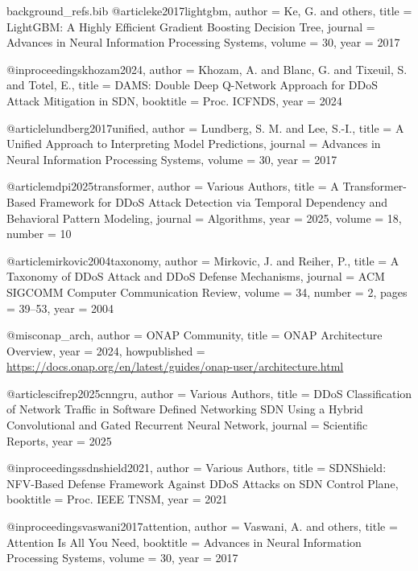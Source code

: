 \begin{filecontents*}{background_refs.bib}
@article{ke2017lightgbm,
  author  = {Ke, G. and others},
  title   = {{LightGBM: A Highly Efficient Gradient Boosting Decision Tree}},
  journal = {Advances in Neural Information Processing Systems},
  volume  = {30},
  year    = {2017}
}

@inproceedings{khozam2024,
  author    = {Khozam, A. and Blanc, G. and Tixeuil, S. and Totel, E.},
  title     = {{DAMS: Double Deep Q-Network Approach for DDoS Attack Mitigation in SDN}},
  booktitle = {Proc. ICFNDS},
  year      = {2024}
}

@article{lundberg2017unified,
  author  = {Lundberg, S. M. and Lee, S.-I.},
  title   = {{A Unified Approach to Interpreting Model Predictions}},
  journal = {Advances in Neural Information Processing Systems},
  volume  = {30},
  year    = {2017}
}

@article{mdpi2025transformer,
  author  = {{Various Authors}},
  title   = {{A Transformer-Based Framework for DDoS Attack Detection via Temporal Dependency and Behavioral Pattern Modeling}},
  journal = {Algorithms},
  year    = {2025},
  volume  = {18},
  number  = {10}
}

@article{mirkovic2004taxonomy,
  author  = {Mirkovic, J. and Reiher, P.},
  title   = {{A Taxonomy of DDoS Attack and DDoS Defense Mechanisms}},
  journal = {ACM SIGCOMM Computer Communication Review},
  volume  = {34},
  number  = {2},
  pages   = {39--53},
  year    = {2004}
}

@misc{onap_arch,
  author       = {{ONAP Community}},
  title        = {{ONAP Architecture Overview}},
  year         = {2024},
  howpublished = {\url{https://docs.onap.org/en/latest/guides/onap-user/architecture.html}}
}

@article{scifrep2025cnngru,
  author  = {{Various Authors}},
  title   = {{DDoS Classification of Network Traffic in Software Defined Networking SDN Using a Hybrid Convolutional and Gated Recurrent Neural Network}},
  journal = {Scientific Reports},
  year    = {2025}
}

@inproceedings{sdnshield2021,
  author    = {{Various Authors}},
  title     = {{SDNShield: NFV-Based Defense Framework Against DDoS Attacks on SDN Control Plane}},
  booktitle = {Proc. IEEE TNSM},
  year      = {2021}
}

@inproceedings{vaswani2017attention,
  author    = {Vaswani, A. and others},
  title     = {{Attention Is All You Need}},
  booktitle = {Advances in Neural Information Processing Systems},
  volume    = {30},
  year      = {2017}
}
  \end{filecontents*}
